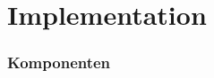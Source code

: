 
\section{Implementation}
\label{sec:Implementation}

\subsubsection{Komponenten}
\label{subsub:impl_Komponenten}

